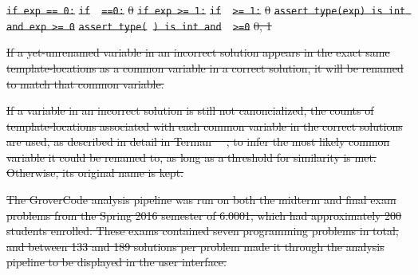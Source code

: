 \documentclass[12pt,twoside]{mitthesis}
\providecommand{\DIFdeltex}[1]{{\protect\color{red}\sout{#1}}}                      %
\providecommand{\DIFdelFL}[1]{\DIFdel{#1}} %
\providecommand{\DIFdel}[1]{\texorpdfstring{\DIFdeltex{#1}}{}} %
\begin{document}
\texttt{\DIFdelFL{if exp == 0:}} %
\texttt{\DIFdelFL{if }\underline{\DIFdelFL{\hspace{1em}}}%
\DIFdelFL{==0:}} %
\DIFdelFL{0 }%
\texttt{\DIFdelFL{if exp >= 1:}} %
\texttt{\DIFdelFL{if }\underline{\DIFdelFL{\hspace{1em}}} %
\DIFdelFL{>= 1:}} %
\DIFdelFL{0 }%
\texttt{\DIFdelFL{assert type(exp) is int and exp >= 0}} %
\texttt{\DIFdelFL{assert type(}\underline{\DIFdelFL{\hspace{1em}}}%
\DIFdelFL{) is int and }\underline{\DIFdelFL{\hspace{1em}}}%
\DIFdelFL{>=0}} %
\DIFdelFL{0, 1 }%

\DIFdel{If a yet-unrenamed variable in an incorrect solution appears in the exact same template-locations as a common variable in a correct solution, it will be renamed to match that common variable.
}%

\DIFdel{If a variable in an incorrect solution is still not canoncialized, the counts of template-locations associated with each common variable in the correct solutions are used, as described in detail in Terman~\mbox{%
\cite{staceythesis}}%
, to infer the most likely common variable it could be renamed to, as long as a threshold for similarity is met. Otherwise, its original name is kept. 
}%


\DIFdel{The GroverCode analysis pipeline was run on both the midterm and final exam problems from the Spring 2016 semester of 6.0001, which had approximately 200 students enrolled. These exams contained seven programming problems in total, and between 133 and 189 solutions per problem made it through the analysis pipeline to be displayed in the user interface. 
}%
\end{document}
